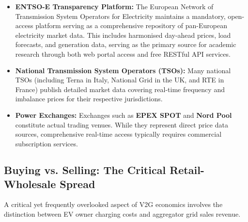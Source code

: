 \begin{itemize}
    \item \textbf{ENTSO-E Transparency Platform:} The European Network of Transmission System Operators for Electricity maintains a mandatory, open-access platform serving as a comprehensive repository of pan-European electricity market data. This includes harmonised day-ahead prices, load forecasts, and generation data, serving as the primary source for academic research through both web portal access and free RESTful API services.
    
    \item \textbf{National Transmission System Operators (TSOs):} Many national TSOs (including Terna in Italy, National Grid in the UK, and RTE in France) publish detailed market data covering real-time frequency and imbalance prices for their respective jurisdictions.
    
    \item \textbf{Power Exchanges:} Exchanges such as \textbf{EPEX SPOT} and \textbf{Nord Pool} constitute actual trading venues. While they represent direct price data sources, comprehensive real-time access typically requires commercial subscription services.
\end{itemize}

\subsection{Buying vs. Selling: The Critical Retail-Wholesale Spread}

A critical yet frequently overlooked aspect of V2G economics involves the distinction between EV owner charging costs and aggregator grid sales revenue.

